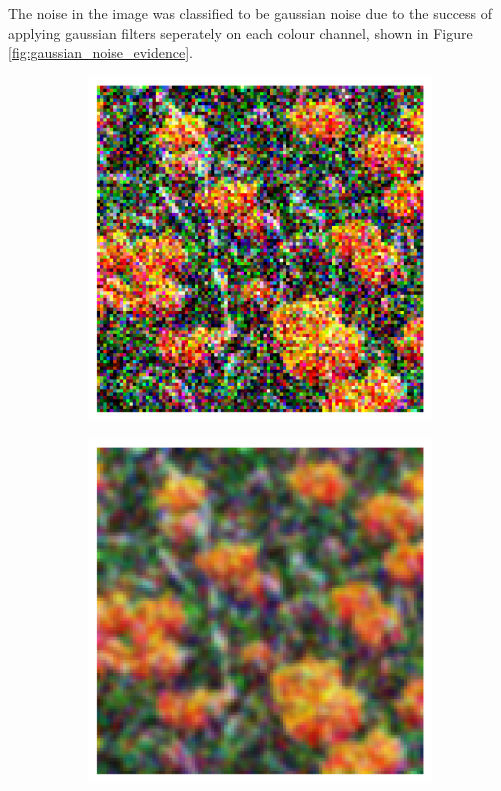 \documentclass[11pt]{article}
\begin{document}
The noise in the image  was classified to be gaussian noise due to the success of applying gaussian filters seperately on each colour channel, shown in Figure \ref{fig:gaussian_noise_evidence}.
\begin{figure}[H]
    \centering
    \begin{subfigure}{.4\textwidth}
        \centering
        \includegraphics[width=\linewidth]{figs/q1b_patch.png}  %
        \caption{}
        \label{fig:flower_patch}
    \end{subfigure}%
    \begin{subfigure}{.4\textwidth}
        \centering
        \includegraphics[width=\linewidth]{figs/q1b_gauss_blurred_patch.png}  %

\end{subfigure}
\end{figure}
\end{document}
